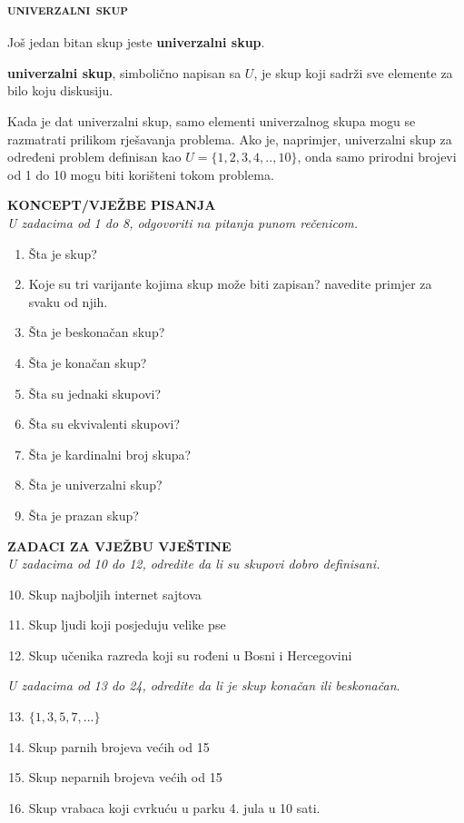 \documentclass[a4paper,14pt,svgnames]{article}
\newcounter{counter}
\begin{document}
\subsubsection{\textsc{univerzalni skup}}
Još jedan bitan skup jeste \textbf{univerzalni skup}.
\begin{tcolorbox}
\textbf{univerzalni skup}, simbolično napisan sa $U$, je skup koji sadrži sve elemente za bilo koju diskusiju.
\end{tcolorbox}
Kada je dat univerzalni skup, samo elementi univerzalnog skupa mogu se razmatrati prilikom rješavanja problema. Ako je, naprimjer, univerzalni skup za određeni problem definisan kao $U=\{1, 2, 3, 4, .., 10\}$, onda samo prirodni brojevi od 1 do 10 mogu biti korišteni tokom problema.

\begin{tcolorbox}[title=\textbf{ZADACI ZA VJEŽBU}]
\begin{minipage}{0.5\textwidth}
\textbf{KONCEPT/VJEŽBE PISANJA}\\
\textit{U zadacima od 1 do 8, odgovoriti na pitanja punom rečenicom.}
\begin{enumerate}
\item Šta je skup?
\item Koje su tri varijante kojima skup može biti zapisan? navedite primjer za svaku od njih.
\item Šta je beskonačan skup?
\item Šta je konačan skup?
\item Šta su jednaki skupovi?
\item Šta su ekvivalenti skupovi?
\item Šta je kardinalni broj skupa?
\item Šta je univerzalni skup?
\item Šta je prazan skup?
\end{enumerate}
\textbf{ZADACI ZA VJEŽBU VJEŠTINE}\\
\textit{U zadacima od 10 do 12, odredite da li su skupovi dobro definisani.}
\begin{enumerate}
\setcounter{enumi}{9}
\item Skup najboljih internet sajtova
\item Skup ljudi koji posjeduju velike pse
\item Skup učenika razreda koji su rođeni u Bosni i Hercegovini
\end{enumerate}
\end{minipage}
\begin{minipage}{0.5\textwidth}
\textit{U zadacima od 13 do 24, odredite da li je skup konačan ili beskonačan}.
\begin{enumerate}
\setcounter{enumi}{12}
\item $\{1, 3, 5, 7, ...\}$
\item Skup parnih brojeva većih od 15
\item Skup neparnih brojeva većih od 15
\item Skup vrabaca koji cvrkuću u parku 4. jula u 10 sati.
\end{enumerate}
\end{minipage}
\end{tcolorbox}
\end{document}
